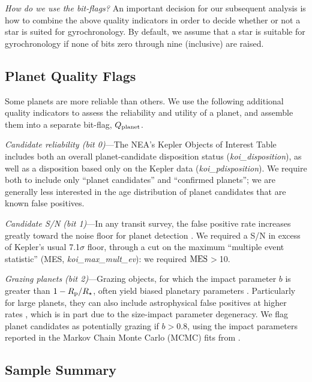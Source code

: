 \documentclass[11pt,twocolumn,tighten]{aastex63}
\begin{document}
{\it How do we use the bit-flags?}
An important decision for our subsequent analysis is how to combine
the above quality indicators in order to decide whether or not a star is suited for
gyrochronology.  By default, we assume that a star is suitable for
gyrochronology if none of bits zero through nine (inclusive) are
raised.


\subsection{Planet Quality Flags}
\label{subsec:plflags}
Some planets are more reliable than others.
We use the following additional quality indicators to assess 
the reliability and utility of a planet, and assemble them into a separate bit-flag,
$Q_{\rm planet}$.

{\it Candidate reliability (bit 0)}---The NEA's Kepler Objects of Interest Table
includes both an overall planet-candidate disposition status
({\it koi\_disposition}), as well as a disposition based only on the Kepler
data ({\it koi\_pdisposition}).
We require both to include only
``planet candidates'' and ``confirmed planets''; we are generally less interested
in the age distribution of planet candidates that are known false positives.

{\it Candidate S/N (bit 1)}---In any transit survey, the false positive rate increases
greatly toward the noise floor for planet detection \citep[e.g.][]{2002ApJ...564..495J}.  We
required a S/N in excess of Kepler's usual 7.1$\sigma$ floor, through a cut on the
maximum
``multiple event statistic'' (MES, {\it koi\_max\_mult\_ev}): we required ${\rm MES}$$>$10.

{\it Grazing planets (bit 2)}---Grazing objects, for which the impact
parameter $b$ is greater than $1-R_{\rm p}/R_\star$,
often yield biased planetary parameters
\citep[e.g.][]{2022AJ....163..111G}.
Particularly for large planets, they can also include
astrophysical false positives at higher rates \citep{2016ApJ...822...86M}, which is
in part due to the size-impact parameter degeneracy.
We flag planet candidates as potentially grazing if $b>0.8$, 
using the impact parameters reported in the Markov Chain
Monte Carlo (MCMC) fits from \citet{Thompson_2018}.


\subsection{Sample Summary}
\label{subsec:tally}
\end{document}
